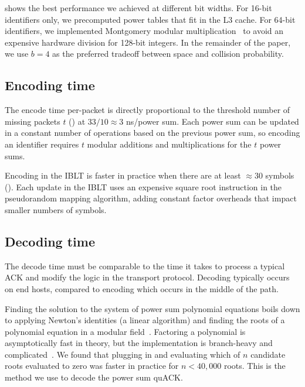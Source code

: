  shows the best performance we achieved at different bit
widths. For 16-bit identifiers only, we precomputed power tables that fit in
the L3 cache. For 64-bit identifiers, we implemented Montgomery modular
multiplication~\cite{montgomery1985modular} to avoid an expensive hardware
division for 128-bit integers. In the remainder of the paper, we use $b=4$ as
the preferred tradeoff between space and collision probability.

\subsection{Encoding time}
\label{sec:quack:microbenchmarks:encoding}

The encode time per-packet is directly proportional to
the threshold number of missing packets $t$ () at
$33/10 \approx 3$ ns/power sum.
Each power sum can be updated in a constant number of operations based on the
previous power sum, so encoding an identifier requires $t$ modular additions
and multiplications for the $t$ power sums.

Encoding in the IBLT is faster in practice when there are at least
$\approx\!30$ symbols ().
Each update in the IBLT uses an expensive square root instruction in the
pseudorandom mapping algorithm, adding constant factor overheads that impact
smaller numbers of symbols.

\subsection{Decoding time}
\label{sec:quack:microbenchmarks:decoding}

The decode time must be comparable to the time it takes to process a typical
ACK and modify the logic in the transport protocol. Decoding typically
occurs on end hosts, compared to encoding which occurs in the middle of the path.

Finding the solution to the system of power sum polynomial equations boils down
to applying Newton's identities (a linear algorithm) and finding the roots of a
polynomial equation
in a modular field~\cite{eppstein2011straggler}.
Factoring a polynomial is asymptotically fast in theory, but the implementation
is branch-heavy and complicated~\cite{batut2000user}.
We found that plugging in and evaluating which of $n$ candidate roots
evaluated to zero was faster in practice for $n < 40,000$ roots.
This is the method we use to decode the power sum quACK.

